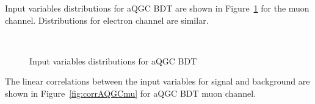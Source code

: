 Input variables distributions for aQGC BDT are shown in Figure~\ref{fig:InAQGCmu} for the muon channel. Distributions for electron channel are similar.

\begin{figure}[]
  \begin{center}
    \\
    \caption{ Input variables distributions for aQGC BDT }
    \label{fig:InAQGCmu}
  \end{center}
\end{figure}

The linear correlations between the input variables for signal and background are shown in Figure~\ref{fig:corrAQGCmu} for aQGC BDT muon channel.

